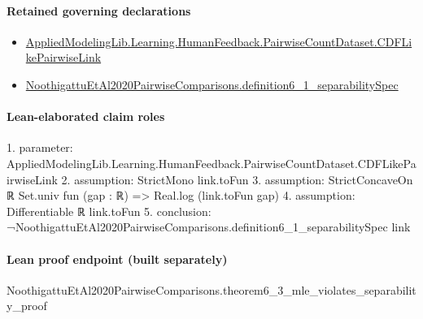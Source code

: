 \documentclass[10pt]{article}
\begin{document}
\paragraph{Retained governing declarations}
\begin{itemize}\raggedright
\item \hyperlink{governing-declaration-3449f3559185d0fd}{Applied\allowbreak{}Modeling\allowbreak{}Lib.\allowbreak{}Learning.\allowbreak{}Human\allowbreak{}Feedback.\allowbreak{}Pairwise\allowbreak{}Count\allowbreak{}Dataset.\allowbreak{}CDF\allowbreak{}Like\allowbreak{}Pairwise\allowbreak{}Link}
\item \hyperlink{paper-prerequisite-eddfe1e162a942bc}{Noothigattu\allowbreak{}Et\allowbreak{}Al2020\allowbreak{}Pairwise\allowbreak{}Comparisons.\allowbreak{}definition6\_\allowbreak{}1\_\allowbreak{}separability\allowbreak{}Spec}
\end{itemize}
\paragraph{Lean-elaborated claim roles}\begin{ReviewVerbatim}
1. parameter: AppliedModelingLib.Learning.HumanFeedback.PairwiseCountDataset.CDFLikePairwiseLink
2. assumption: StrictMono link.toFun
3. assumption: StrictConcaveOn ℝ Set.univ fun (gap : ℝ) => Real.log (link.toFun gap)
4. assumption: Differentiable ℝ link.toFun
5. conclusion: ¬NoothigattuEtAl2020PairwiseComparisons.definition6_1_separabilitySpec link
\end{ReviewVerbatim}

\paragraph{Lean proof endpoint (built separately)}\begin{ReviewVerbatim}
NoothigattuEtAl2020PairwiseComparisons.theorem6_3_mle_violates_separability_proof
\end{ReviewVerbatim}
\end{document}
